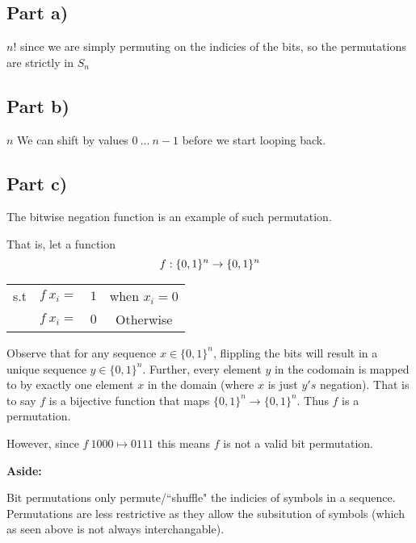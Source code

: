 \documentclass{article}
\numberwithin{equation}{subsection}
\begin{document}
	\subsection*{Part a)}
	$n!$ \quad since we are simply permuting on the indicies of the bits, so the permutations are strictly in $S_n$

	\subsection*{Part b)}
	$n$ \quad We can shift by values $0 \ ... \ n-1$ before we start looping back.

	\subsection*{Part c)}
	The bitwise negation function is an example of such permutation.

	\vspace{10pt}
	That is, let a function
	\begin{equation}\notag
		f: \{0,1\}^n \rightarrow \{0,1\}^n	
	\end{equation}
	\begin{center}
		\begin{tabular}{c c c c}
			s.t & $f \ x_i =$ & $ 1$ & when $x_i = 0$ \\
			 & $f \ x_i =$ & $ 0$ & Otherwise
		\end{tabular}
	\end{center}

	\vspace{10pt}
	Observe that for any sequence $x \in \{0,1\}^n$, flippling the bits will result
	in a unique sequence $y\in \{0,1\}^n$. Further, every element $y$ in the codomain is mapped
	to by exactly one element $x$ in the domain (where $x$ is just $y's$ negation). That is to say
	$f$ is a bijective function that maps $\{0,1\}^n \rightarrow \{0,1\}^n$. Thus $f$ is a permutation.

	However, since $f \ 1000 \mapsto 0111$ this means $f$ is not a valid bit permutation.

	\vspace{10pt}
	\begin{adjustwidth}{2em}{2em}
		\textbf{Aside:}

		Bit permutations only permute/``shuffle" the indicies of symbols in a sequence. Permutations
		are less restrictive as they allow the subsitution of symbols (which as seen above is not always
		interchangable).
	\end{adjustwidth}
\end{document}

